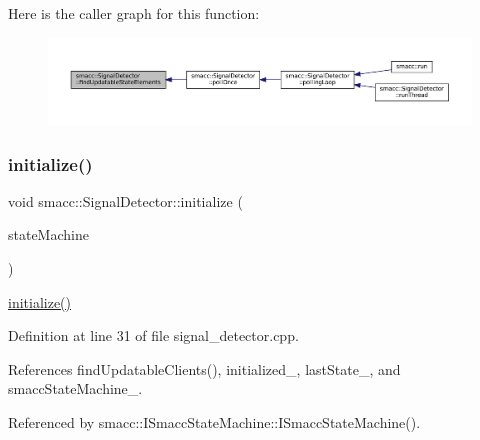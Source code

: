 Here is the caller graph for this function\+:
\nopagebreak
\begin{figure}[H]
\begin{center}
\leavevmode
\includegraphics[width=350pt]{classsmacc_1_1SignalDetector_a443234ebdf8cedd45cde725e64639dfe_icgraph}
\end{center}
\end{figure}
\mbox{\label{classsmacc_1_1SignalDetector_a91ab3cd92d8095cdaf8610b50731f04b}} 
\subsubsection{\texorpdfstring{initialize()}{initialize()}}
{\footnotesize\ttfamily void smacc\+::\+Signal\+Detector\+::initialize (\begin{DoxyParamCaption}\item[{\hyperlink{classsmacc_1_1ISmaccStateMachine}{I\+Smacc\+State\+Machine} $\ast$}]{state\+Machine }\end{DoxyParamCaption})}

\hyperlink{classsmacc_1_1SignalDetector_a91ab3cd92d8095cdaf8610b50731f04b}{initialize()} 

Definition at line 31 of file signal\+\_\+detector.\+cpp.



References find\+Updatable\+Clients(), initialized\+\_\+, last\+State\+\_\+, and smacc\+State\+Machine\+\_\+.



Referenced by smacc\+::\+I\+Smacc\+State\+Machine\+::\+I\+Smacc\+State\+Machine().


